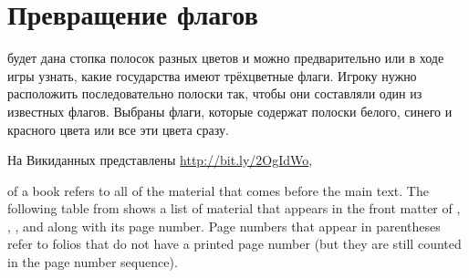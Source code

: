 \chapter{Превращение флагов}
\label{ch:draughts-moves}

 будет дана стопка полосок разных цветов и 
можно предварительно или в ходе игры узнать, какие государства имеют трёхцветные флаги. 
Игроку нужно расположить последовательно полоски так, чтобы они составляли один из известных флагов. 
Выбраны флаги, которые содержат полоски белого, синего и красного цвета или все эти цвета сразу.

На Викиданных представлены \hyperref[328 государственных флага]{http://bit.ly/2OgIdWo}, 



 of a book refers to all of the material that
comes before the main text.  The following table from shows a list of
material that appears in the front matter of \VDQI, \EI, \VE, and \BE
along with its page number.  Page numbers that appear in parentheses refer
to folios that do not have a printed page number (but they are still
counted in the page number sequence).
